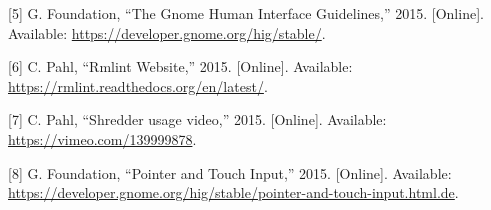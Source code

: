 \documentclass[11pt,ngerman,toc=listof,index=totoc]{scrreprt}
\begin{document}
\hypertarget{ref-hig}{}
{[}5{]} G. Foundation, ``The Gnome Human Interface Guidelines,'' 2015.
{[}Online{]}. Available: \url{https://developer.gnome.org/hig/stable/}.

\hypertarget{ref-rmlint}{}
{[}6{]} C. Pahl, ``Rmlint Website,'' 2015. {[}Online{]}. Available:
\url{https://rmlint.readthedocs.org/en/latest/}.

\hypertarget{ref-shredderux5fvideo}{}
{[}7{]} C. Pahl, ``Shredder usage video,'' 2015. {[}Online{]}.
Available: \url{https://vimeo.com/139999878}.

\hypertarget{ref-mobile}{}
{[}8{]} G. Foundation, ``Pointer and Touch Input,'' 2015. {[}Online{]}.
Available:
\url{https://developer.gnome.org/hig/stable/pointer-and-touch-input.html.de}.
\end{document}
